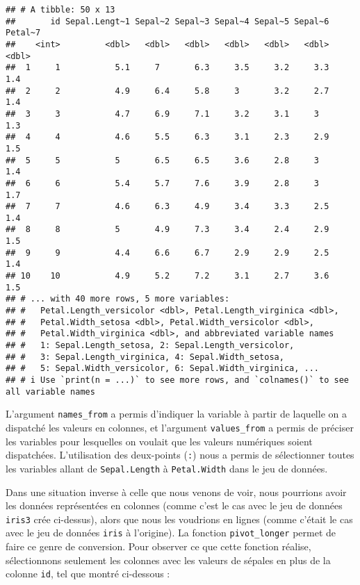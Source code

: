 \documentclass[
  french,
]{book}
\begin{document}
\begin{verbatim}
## # A tibble: 50 x 13
##       id Sepal.Lengt~1 Sepal~2 Sepal~3 Sepal~4 Sepal~5 Sepal~6 Petal~7
##    <int>         <dbl>   <dbl>   <dbl>   <dbl>   <dbl>   <dbl>   <dbl>
##  1     1           5.1     7       6.3     3.5     3.2     3.3     1.4
##  2     2           4.9     6.4     5.8     3       3.2     2.7     1.4
##  3     3           4.7     6.9     7.1     3.2     3.1     3       1.3
##  4     4           4.6     5.5     6.3     3.1     2.3     2.9     1.5
##  5     5           5       6.5     6.5     3.6     2.8     3       1.4
##  6     6           5.4     5.7     7.6     3.9     2.8     3       1.7
##  7     7           4.6     6.3     4.9     3.4     3.3     2.5     1.4
##  8     8           5       4.9     7.3     3.4     2.4     2.9     1.5
##  9     9           4.4     6.6     6.7     2.9     2.9     2.5     1.4
## 10    10           4.9     5.2     7.2     3.1     2.7     3.6     1.5
## # ... with 40 more rows, 5 more variables:
## #   Petal.Length_versicolor <dbl>, Petal.Length_virginica <dbl>,
## #   Petal.Width_setosa <dbl>, Petal.Width_versicolor <dbl>,
## #   Petal.Width_virginica <dbl>, and abbreviated variable names
## #   1: Sepal.Length_setosa, 2: Sepal.Length_versicolor,
## #   3: Sepal.Length_virginica, 4: Sepal.Width_setosa,
## #   5: Sepal.Width_versicolor, 6: Sepal.Width_virginica, ...
## # i Use `print(n = ...)` to see more rows, and `colnames()` to see all variable names
\end{verbatim}

L'argument \texttt{names\_from} a permis d'indiquer la variable à partir de laquelle on a dispatché les valeurs en colonnes, et l'argument \texttt{values\_from} a permis de préciser les variables pour lesquelles on voulait que les valeurs numériques soient dispatchées. L'utilisation des deux-points (\texttt{:}) nous a permis de sélectionner toutes les variables allant de \texttt{Sepal.Length} à \texttt{Petal.Width} dans le jeu de données.

Dans une situation inverse à celle que nous venons de voir, nous pourrions avoir les données représentées en colonnes (comme c'est le cas avec le jeu de données \texttt{iris3} crée ci-dessus), alors que nous les voudrions en lignes (comme c'était le cas avec le jeu de données \texttt{iris} à l'origine). La fonction \texttt{pivot\_longer} permet de faire ce genre de conversion. Pour observer ce que cette fonction réalise, sélectionnons seulement les colonnes avec les valeurs de sépales en plus de la colonne \texttt{id}, tel que montré ci-dessous :
\end{document}
